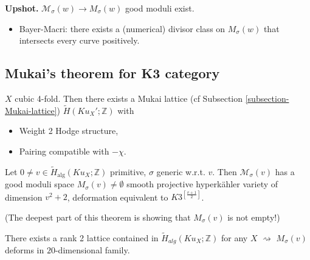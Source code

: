 \medskip\noindent
{\bf Upshot.} $\mathcal{M}_{\sigma}(w) \to M_{\sigma}(w)$ good moduli exist.

\begin{itemize}
\item Bayer-Macri: there exists a (numerical) divisor class on $M_{\sigma}(w)$
that intersects every curve positively.
\end{itemize}

\subsection{Mukai's theorem for K3 category}
\label{subsection-Mukais-theorem-for-K3-category}

\begin{proposition}
\label{proposition-4-fold-Mukai-lattice}
$X$ cubic 4-fold. Then there exists a Mukai lattice (cf Subsection
\ref{subsection-Mukai-lattice}) $\tilde{H}(Ku_X';\mathbb{Z})$ with
\begin{itemize}
\item Weight 2 Hodge structure,
\item Pairing compatible with $-\chi$.
\end{itemize}
\end{proposition}

\begin{theorem}[BLMNPS]
\label{theorem-BLMNPS}
Let $0 \neq  v \in \tilde{H}_{\text{alg}}(Ku_X;\mathbb{Z})$ primitive, $\sigma$
generic w.r.t. $v$. Then $\mathcal{M}_{\sigma}(v)$ has a good moduli space
$M_{\sigma}(v)\neq \emptyset$ 
smooth projective hyperkähler variety of dimension $v^2+2$,
deformation equivalent to $K3^{\left[ \frac{v+1}{2 } \right] }$.
\end{theorem}

(The deepest part of this theorem is showing that
$M_{\sigma}(v)$ is not empty!)

\medskip\noindent
There exists a rank 2 lattice contained in $\tilde{H}_{alg}(Ku_X;\mathbb{Z})$
for any $X$ $\rightsquigarrow $ $M_\sigma(v)$ deforms in $20$-dimensional
family.


